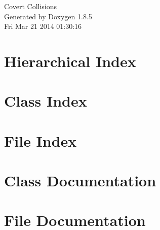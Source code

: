 \documentclass[twoside]{book}
\newcommand{\clearemptydoublepage}{%
  \newpage{\pagestyle{empty}\cleardoublepage}%
}
\begin{document}
\hypersetup{pageanchor=false}
\begin{titlepage}
\vspace*{7cm}
\begin{center}%
{\Large Covert Collisions }\\
\vspace*{1cm}
{\large Generated by Doxygen 1.8.5}\\
\vspace*{0.5cm}
{\small Fri Mar 21 2014 01:30:16}\\
\end{center}
\end{titlepage}
\clearemptydoublepage
\tableofcontents
\clearemptydoublepage
{}
\hypersetup{pageanchor=true}

\chapter{Hierarchical Index}

\chapter{Class Index}

\chapter{File Index}

\chapter{Class Documentation}




















\chapter{File Documentation}









































\newpage
{}
{}
\printindex
\end{document}
